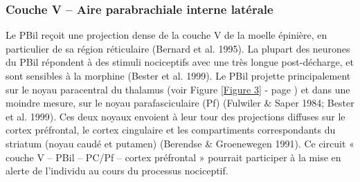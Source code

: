 \documentclass[a4paper,12pt,twoside]{report}
\begin{document}
\subsubsection{Couche V – Aire parabrachiale interne latérale}

Le PBil reçoit une projection dense de la couche V de la moelle épinière, en particulier de sa région réticulaire (Bernard et al. 1995). La plupart des neurones du PBil répondent à des stimuli nociceptifs avec une très longue post-décharge, et sont sensibles à la morphine (Bester et al. 1999). Le PBil projette principalement sur le noyau paracentral du thalamus (voir Figure \ref{Figure 3} - page \pageref{Figure 3}) et dans une moindre mesure, sur le noyau parafasciculaire (Pf) (Fulwiler \& Saper 1984; Bester et al. 1999). Ces deux noyaux envoient à leur tour des projections diffuses sur le cortex préfrontal, le cortex cingulaire et les compartiments correspondants du striatum (noyau caudé et putamen) (Berendse \& Groenewegen 1991). Ce circuit « couche V – PBil – PC/Pf – cortex préfrontal » pourrait participer à la mise en alerte de l'individu au cours du processus nociceptif.
\end{document}
